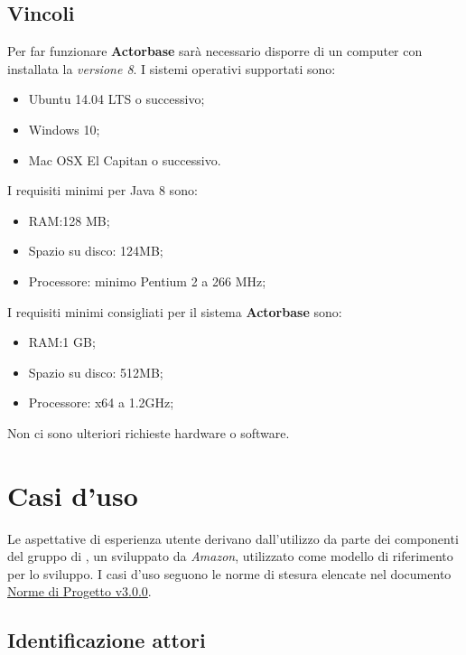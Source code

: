 \documentclass{scalatekids-article}
\begin{document}
\subsection{Vincoli}
Per far funzionare \textbf{Actorbase} sarà necessario disporre di un computer con
installata la \textit{ versione 8}. I sistemi operativi supportati sono:
\begin{itemize}
\item Ubuntu 14.04 LTS o successivo;
\item Windows 10;
\item Mac OSX El Capitan o successivo.
\end{itemize}
I requisiti minimi per Java 8 sono:
\begin{itemize}
\item RAM:\@128 MB;\@
\item Spazio su disco: 124MB;\@
\item Processore: minimo Pentium 2 a 266 MHz;
\end{itemize}
I requisiti minimi consigliati per il sistema \textbf{Actorbase} sono:
\begin{itemize}
\item RAM:\@1 GB;\@
\item Spazio su disco: 512MB;\@
\item Processore: x64 a 1.2GHz;
\end{itemize}
Non ci sono ulteriori richieste hardware o software.

\section{Casi d'uso}

Le aspettative di esperienza utente derivano dall'utilizzo da parte dei
componenti del gruppo di , un 
 sviluppato da \textit{Amazon}, utilizzato come modello di
riferimento per lo sviluppo. I casi d'uso seguono le norme di stesura elencate
nel documento \href{run:../Interni/NormeDiProgetto\_v3.0.0.pdf}{Norme di
  Progetto v3.0.0}.

\subsection{Identificazione attori}
\end{document}
